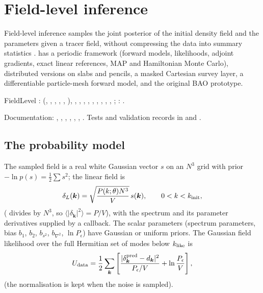 \chapter{Field-level inference}\label{ch:field-level}

Field-level inference samples the joint posterior of the initial density field and the parameters given a tracer field, without
compressing the data into summary statistics \cite{JascheWandelt2013,Stadler2024}. \fml{} has a periodic framework (forward models,
likelihoods, adjoint gradients, exact linear references, MAP and Hamiltonian Monte Carlo), distributed versions on slabs and pencils, a
masked Cartesian survey layer, a differentiable particle-mesh forward model, and the original BAO prototype.

\begin{modulebox}{FieldLevel}
:  (, , , ,
, ), , , ,
, , , ,
, , ; : .\par
Documentation: , , , , ,
, . Tests and validation records in  and .
\end{modulebox}

\section{The probability model}\label{sec:fl-model}

The sampled field is a real white Gaussian vector $s$ on an $N^3$ grid with prior $-\ln p(s)=\frac12\sum s^2$; the linear field is
\begin{equation}
\delta_L(\bm k)=\sqrt{\frac{P(k;\theta)N^3}{V}}\,s(\bm k),\qquad0<k<k_{\rm init},
\end{equation}
( divides by $N^3$, so $\langle|\delta_{\bm k}|^2\rangle=P/V$), with the spectrum and its parameter derivatives supplied by a callback.
The scalar parameters (spectrum parameters, bias $b_1$, $b_2$, $b_{s^2}$, $b_{\nabla^2}$, $\ln P_\epsilon$) have Gaussian or uniform priors. The Gaussian
field likelihood over the full Hermitian set of modes below $k_{\rm like}$ is
\begin{equation}
U_{\rm data}=\frac12\sum_{\bm k}\left[\frac{|\delta^{\rm pred}_{\bm k}-d_{\bm k}|^2}{P_\epsilon/V}+\ln\frac{P_\epsilon}{V}\right],
\end{equation}
(the normalisation is kept when the noise is sampled).

